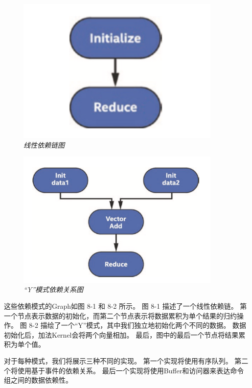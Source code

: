 \begin{figure}[H]
	\centering
	\includegraphics[width=0.9\textwidth]{figs/F8.1.png}
	\caption{\textit{线性依赖链图 }}
\end{figure}

\begin{figure}[H]
	\centering
	\includegraphics[width=0.9\textwidth]{figs/F8.2.png}
	\caption{\textit{“Y”模式依赖关系图 }}
\end{figure}

这些依赖模式的Graph如图 8-1 和 8-2 所示。 图 8-1 描述了一个线性依赖链。 
第一个节点表示数据的初始化，而第二个节点表示将数据累积为单个结果的归约操作。 
图 8-2 描绘了一个“Y”模式，其中我们独立地初始化两个不同的数据。 数据初始化后，加法Kernel会将两个向量相加。 
最后，图中的最后一个节点将结果累积为单个值。

对于每种模式，我们将展示三种不同的实现。 第一个实现将使用有序队列。 第二个将使用基于事件的依赖关系。 
最后一个实现将使用Buffer和访问器来表达命令组之间的数据依赖性。

